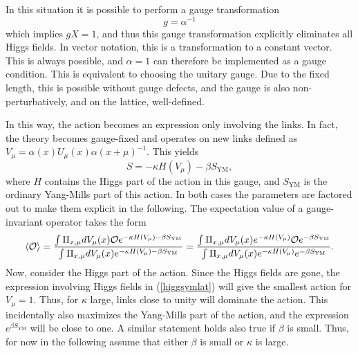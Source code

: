 \documentclass[final,12pt,3p,longtitle]{elsarticle}
\newcommand*{\no}{\noindent}
\newcommand*{\be}{\begin{equation}}
\newcommand*{\ee}{\end{equation}}
\newcommand*{\pref}[1]{(\ref{#1})}
\newcommand*{\nn}{\nonumber}
\newcommand*{\1}{1\!\!\!\bot}
\newcommand*{\la}{\left\langle}
\newcommand*{\ra}{\right\rangle}
\newcommand*{\op}{{\cal O}}
\newcommand*{\ym}{{\text{YM}}}
\begin{document}
In this situation it is possible to perform a gauge transformation
\be
g=\alpha^{-1}\nn
\ee
\no which implies $gX=1$, and thus this gauge transformation explicitly eliminates all Higgs fields. In vector notation, this is a transformation to a constant vector. This is always possible, and $\alpha=1$ can therefore be implemented as a gauge condition. This is equivalent to choosing the unitary gauge. Due to the fixed length, this is possible without gauge defects, and the gauge is also non-perturbatively, and on the lattice, well-defined.

In this way, the action becomes an expression only involving the links. In fact, the theory becomes gauge-fixed and operates on new links defined as $V_\mu=\alpha(x) U_\mu(x)\alpha(x+\mu)^{-1}$. This yields
\be
S=-\kappa H(V_\mu)-\beta S_\ym\nn,
\ee
\no where $H$ contains the Higgs part of the action in this gauge, and $S_\text{YM}$ is the ordinary Yang-Mills part of this action. In both cases the parameters are factored out to make them explicit in the following. The expectation value of a gauge-invariant operator takes the form
\be
\la\op\ra=\frac{\int\Pi_{x,\mu}dV_\mu(x)\op e^{-\kappa H(V_\mu)-\beta S_\ym}}{\int\Pi_{x,\mu}dV_\mu(x) e^{-\kappa H(V_\mu)-\beta S_\ym}}=\frac{\int\Pi_{x,\mu}dV_\mu(x)e^{-\kappa H(V_\mu)}\op e^{-\beta S_\ym}}{\int\Pi_{x,\mu}dV_\mu(x) e^{-\kappa H(V_\mu)}e^{-\beta S_\ym}}\nn.
\ee
\no Now, consider the Higgs part of the action. Since the Higgs fields are gone, the expression involving Higgs fields in \pref{higgsymlat} will give the smallest action for $V_\mu=1$. Thus, for $\kappa$ large, links close to unity will dominate the action. This incidentally also maximizes the Yang-Mills part of the action, and the expression $e^{\beta S_\ym}$ will be close to one. A similar statement holds also true if $\beta$ is small. Thus, for now in the following assume that either $\beta$ is small or $\kappa$ is large.
\end{document}
